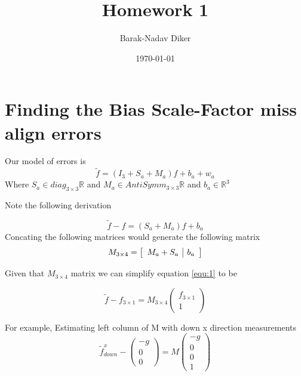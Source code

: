 \documentclass[11pt]{article}
\author{Barak-Nadav Diker}
\date{\today}
\title{Homework 1}
\begin{document}
\maketitle
\tableofcontents

\section{Finding the Bias Scale-Factor miss align errors}
\label{sec:org1303fa5}



Our model of errors is
\label{equ:1}
\begin{equation}
\tilde{f} = (I_3+S_a+M_a)f+b_a+w_a 
\end{equation}
Where
\begin{math}
S_a\in diag_{3\times 3}\mathbb{R}
\end{math}
and 
\begin{math}
M_a\in AntiSymm_{3\times 3}\mathbb{R}
\end{math}
and
\begin{math}
b_a\in \mathbb{R}^3
\end{math}

Note the following derivation

\begin{equation*}
\tilde{f}-f = (S_a+M_a)f+b_a
\end{equation*}
Concating the following matrices would generate the following matrix 
\begin{equation*}
M_{3\times 4}=
\left[
\begin{array}{c | c}
M_a+S_a & b_a
\end{array}
\right]
\end{equation*}

Given that \(M_{3\times 4}\) matrix we can simplify equation \ref{equ:1}
to be

\begin{equation*}
\tilde{f} - f_{3\times 1 } = M_{3\times 4}
\begin{pmatrix}
f_{3\times 1 } \\ 1 
\end{pmatrix}
\end{equation*}

For example, Estimating left column of M with down x direction measurements
\begin{equation*}
\tilde{f}_{down}^x-
\begin{pmatrix}
-g \\ 0 \\ 0 
\end{pmatrix} = M
\begin{pmatrix}
-g \\ 0 \\ 0 \\ 1
\end{pmatrix}
\end{equation*}
\end{document}
